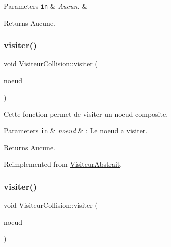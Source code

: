 \begin{DoxyParams}[1]{Parameters}
\mbox{\tt in}  & {\em Aucun.} & \\
\hline
\end{DoxyParams}
\begin{DoxyReturn}{Returns}
Aucune. 
\end{DoxyReturn}
\hypertarget{class_visiteur_collision_a60a7af24c85b42f39bdb9cf22b213f03}{}\label{class_visiteur_collision_a60a7af24c85b42f39bdb9cf22b213f03} 
\subsubsection{\texorpdfstring{visiter()}{visiter()}\hspace{0.1cm}{\footnotesize\ttfamily [1/8]}}
{\footnotesize\ttfamily void Visiteur\+Collision\+::visiter (\begin{DoxyParamCaption}\item[{\hyperlink{class_noeud_composite}{Noeud\+Composite} $\ast$}]{noeud }\end{DoxyParamCaption})\hspace{0.3cm}{\ttfamily [virtual]}}

Cette fonction permet de visiter un noeud composite.


\begin{DoxyParams}[1]{Parameters}
\mbox{\tt in}  & {\em noeud} & \+: Le noeud a visiter.\\
\hline
\end{DoxyParams}
\begin{DoxyReturn}{Returns}
Aucune. 
\end{DoxyReturn}


Reimplemented from \hyperlink{class_visiteur_abstrait}{Visiteur\+Abstrait}.

\hypertarget{class_visiteur_collision_ab5a50a3f4a1b1658eb0106a1f455fbaa}{}\label{class_visiteur_collision_ab5a50a3f4a1b1658eb0106a1f455fbaa} 
\subsubsection{\texorpdfstring{visiter()}{visiter()}\hspace{0.1cm}{\footnotesize\ttfamily [2/8]}}
{\footnotesize\ttfamily void Visiteur\+Collision\+::visiter (\begin{DoxyParamCaption}\item[{\hyperlink{class_noeud_maillet}{Noeud\+Maillet} $\ast$}]{noeud }\end{DoxyParamCaption})\hspace{0.3cm}{\ttfamily [virtual]}}


